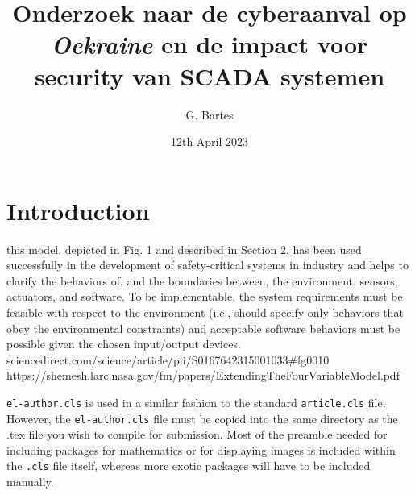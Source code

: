 \documentclass[11pt]{report}
\date{12th April 2023}
\begin{document}
\title{Onderzoek naar de cyberaanval  op \emph{Oekraine} en de impact voor security van SCADA systemen}

\author{G. Bartes}


\maketitle

\section{Introduction}


this model, depicted in Fig. 1 and described in Section 2, has been used successfully in the development of safety-critical systems in industry and helps to clarify the behaviors of, and the boundaries between, the environment, sensors, actuators, and software. To be implementable, the system requirements must be feasible with respect to the environment (i.e., should specify only behaviors that obey the environmental constraints) and acceptable software behaviors must be possible given the chosen input/output devices. 
sciencedirect.com/science/article/pii/S0167642315001033#fg0010
https://shemesh.larc.nasa.gov/fm/papers/ExtendingTheFourVariableModel.pdf




\verb"el-author.cls" is used in a similar fashion to the standard \verb"article.cls" file. However, the \verb"el-author.cls" file must be copied into the same directory as the .tex file you wish to compile for submission. Most of the preamble needed for including packages for mathematics or for displaying images is included within the \verb".cls" file itself, whereas more exotic packages will have to be included manually.
\end{document}
